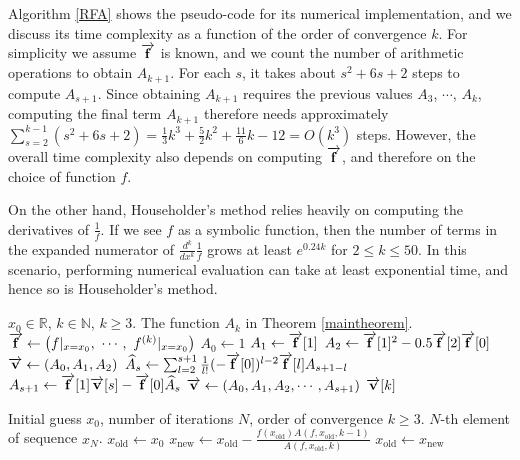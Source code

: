 \documentclass{article}
\begin{document}
Algorithm \ref{RFA} shows the pseudo-code for its numerical implementation, and we discuss its time complexity as a function of the order of convergence $k$. For simplicity we assume $\overrightarrow{\bf f}$ is known, and we count the number of arithmetic operations to obtain $A_{k+1}$. For each $s$, it takes about $s^2+6s+2$ steps to compute $A_{s+1}$. Since obtaining $A_{k+1}$ requires the previous values $A_{3}$, $\cdots$, $A_{k}$, computing the final term $A_{k+1}$ therefore needs approximately $\sum_{s=2}^{k-1}(s^{2}+6s+2)=\frac{1}{3}k^{3}+\frac{5}{2}k^{2}+\frac{11}{6}k-12=O(k^{3})$ steps. However, the overall time complexity also depends on computing $\overrightarrow{\bf f}$, and therefore on the choice of function $f$. 

On the other hand, Householder's method relies heavily on computing the derivatives of $\frac{1}{f}$. If we see $f$ as a symbolic function, then the number of terms in the expanded numerator of $\frac{d^{k}}{dx^{k}}\frac{1}{f}$ grows at least $e^{0.24k}$ for $2\leq k\leq 50$. In this scenario, performing numerical evaluation can take at least exponential time, and hence so is Householder's method.

\begin{algorithm}[t!]
	 \caption{Root-Finding algorithm}\label{RFA}
	\begin{algorithmic}[1]
	\Require $x_{0}\in\mathbb{R}$, $k\in \mathbb{N}$, $k\geq3$.
	\Ensure The function $A_{k}$ in Theorem \ref{maintheorem}.
		\State $\overrightarrow{\bf f} \gets \left(f|_{x=x_{0}},\ \cdots,\ f^{(k)}|_{x=x_{0}}\right)$
		\State $A_{0} \gets 1$
		\State $A_{1} \gets \overrightarrow{\bf f}[1]$
		\State $A_{2} \gets \overrightarrow{\bf f}[1]^{2}-0.5\overrightarrow{\bf f}[2]\overrightarrow{\bf f}[0]$
		\State $\overrightarrow{\bf v} \gets (A_{0}, A_{1}, A_{2})$
		\State $\widehat{A}_{s}\gets  \sum_{l=2}^{s+1}\frac{1}{l!}(-\overrightarrow{\bf f}[0])^{l-2}\overrightarrow{\bf f}[l]A_{s+1-l}$
		\State $A_{s+1} \gets \overrightarrow{\bf f}[1]\overrightarrow{\bf v}[s]-\overrightarrow{\bf f}[0]\widehat{A}_{s}$
		\State $\overrightarrow{\bf v} \gets (A_{0},A_{1},A_{2},\cdots, A_{s+1})$
		\EndFor
		\State \Return $\overrightarrow{\bf v}[k]$
		\EndProcedure
	\end{algorithmic}
	\begin{algorithmic}[1]
		\Require Initial guess $x_{0}$, number of iterations $N$, order of convergence $k\geq 3$.
		\Ensure $N$-th element of sequence $x_{N}$.
		\State $x_{\text{old}} \gets x_{0}$
		\State $x_{\text{new}}\gets x_{\text{old}}-\frac{f(x_{\text{old}})A(f,x_{\text{old}},k-1)}{A(f,x_{\text{old}},k)}$
		\State $x_{\text{old}} \gets x_{\text{new}}$
		\EndFor
	\end{algorithmic}
\end{algorithm}
\end{document}
